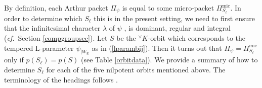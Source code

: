 \documentclass[a4paper, 11pt]{article}
\begin{document}
By definition, each Arthur packet $\Pi_{\psi}$  is equal to
some micro-packet 
$\Pi^{\mathrm{mic}}_{S_{\ell}}$.  In order to determine which
$S_{\ell}$ this is in the present setting, we
need to first ensure that the infinitesimal character $\lambda$ of $\psi$
\cite[(22.8)(c)]{ABV}, is
dominant, regular and integral (\emph{cf.}~Section \ref{compgroupsec}).  Let
$S$ be the ${^\vee}K$-orbit which corresponds to the  tempered L-parameter
$\psi_{|W_{\mathbb{R}}}$ as in (\ref{lparambij}). Then
it turns out that $\Pi_{\psi} = \Pi_{S_{\ell}}^{\mathrm{mic}}$ only if $p(S_{\ell})
= p(S)$ (see Table \ref{orbitdata}).  
We provide a summary of how to determine $S_{\ell}$ for each of the five
nilpotent orbits mentioned above.  The 
terminology of the headings follows \cite[Table 7.18]{HumphCC}.
\end{document}
